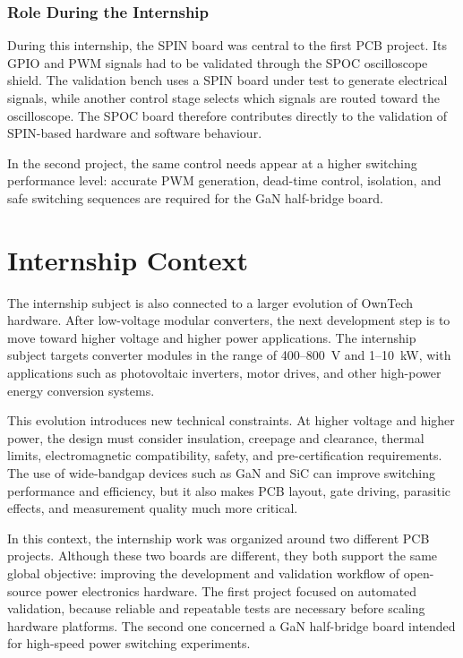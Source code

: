 \subsubsection{Role During the Internship}

During this internship, the SPIN board was central to the first PCB project.
Its GPIO and PWM signals had to be validated through the SPOC oscilloscope
shield. The validation bench uses a SPIN board under test to generate
electrical signals, while another control stage selects which signals are
routed toward the oscilloscope. The SPOC board therefore contributes directly
to the validation of SPIN-based hardware and software behaviour.

In the second project, the same control needs appear at a higher switching
performance level: accurate PWM generation, dead-time control, isolation, and
safe switching sequences are required for the GaN half-bridge board.
\section{Internship Context}

The internship subject is also connected to a larger evolution of OwnTech
hardware. After low-voltage modular converters, the next development step is to
move toward higher voltage and higher power applications. The internship
subject targets converter modules in the range of 400--800~V and 1--10~kW,
with applications such as photovoltaic inverters, motor drives, and other
high-power energy conversion systems.

This evolution introduces new technical constraints. At higher voltage and
higher power, the design must consider insulation, creepage and clearance,
thermal limits, electromagnetic compatibility, safety, and pre-certification
requirements. The use of wide-bandgap devices such as GaN and SiC can improve
switching performance and efficiency, but it also makes PCB layout, gate
driving, parasitic effects, and measurement quality much more critical.

In this context, the internship work was organized around two different PCB
projects. Although these two boards are different, they both support the same
global objective: improving the development and validation workflow of
open-source power electronics hardware. The first project focused on automated
validation, because reliable and repeatable tests are necessary before scaling
hardware platforms. The second one concerned a GaN half-bridge board intended
for high-speed power switching experiments.

